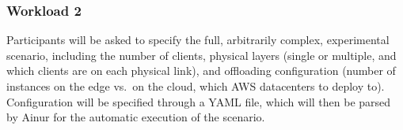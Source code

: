 \subsubsection{Workload 2}

Participants will be asked to specify the full, arbitrarily complex, experimental scenario, including the number of clients, physical layers (single or multiple, and which clients are on each physical link), and offloading configuration (number of instances on the edge vs.\ on the cloud, which \gls{AWS} datacenters to deploy to).
Configuration will be specified through a \gls{YAML} file, which will then be parsed by Ainur for the automatic execution of the scenario.